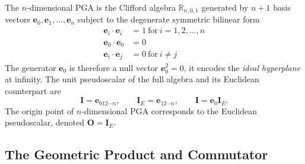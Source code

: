 \documentclass{birkjour}
\theoremstyle{definition}
\theoremstyle{remark}
\begin{document}
The $n$-dimensional PGA is the Clifford algebra
$\mathbb{R}_{n,0,1}$ generated by $n+1$ basis vectors
$\mathbf{e}_0, \mathbf{e}_1, \ldots, \mathbf{e}_n$ subject to the
degenerate symmetric bilinear form
\begin{equation}
\begin{aligned}
  \mathbf{e}_i \cdot \mathbf{e}_i &= 1~\text{for}~i = 1, 2, \ldots, n \\
  \mathbf{e}_0 \cdot \mathbf{e}_0 &= 0 \\
  \mathbf{e}_i \cdot \mathbf{e}_j &= 0~\text{for}~i \neq j
\end{aligned}
\end{equation}
The generator $\mathbf{e}_0$ is therefore a null vector $\mathbf{e}_0^2 = 0$, it encodes the \emph{ideal hyperplane} at infinity. The unit pseudoscalar of the full algebra and its Euclidean counterpart are
\begin{equation}
  \mathbf{I} = \mathbf{e}_{012\cdots n},
  \qquad
  \mathbf{I}_E = \mathbf{e}_{12\cdots n}, 
  \qquad
  \mathbf{I} = \mathbf{e}_0 \mathbf{I}_E.
\end{equation}
The origin point of $n$-dimensional PGA corresponds to the Euclidean pseudoscalar, denoted $\mathbf{O} = \mathbf{I}_E$.

\subsection{The Geometric Product and Commutator}
\label{sec:products}
\end{document}
